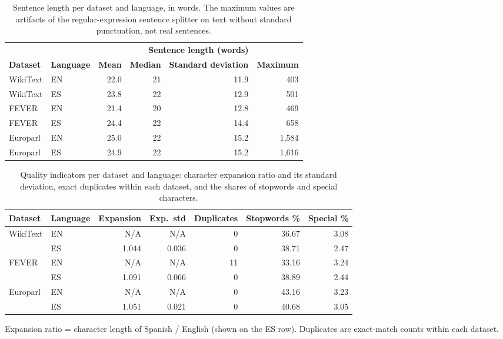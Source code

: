 \documentclass[11pt]{article}
\begin{document}
\begin{table}[h!]
\centering
\caption{Sentence length per dataset and language, in words. The maximum values are artifacts of the regular-expression sentence splitter on text without standard punctuation, not real sentences.}
\label{tabS:syntactic-stats}
\scriptsize
\begin{tabular*}{\textwidth}{@{\extracolsep{\fill}}llrrrr}
\toprule
& & \multicolumn{4}{c}{\textbf{Sentence length (words)}} \\
\cmidrule(lr){3-6}
\textbf{Dataset} & \textbf{Language} & \textbf{Mean} & \textbf{Median} & \textbf{Standard deviation} & \textbf{Maximum} \\
\midrule
WikiText & EN & 22.0 & 21 & 11.9 & 403 \\
WikiText & ES & 23.8 & 22 & 12.9 & 501 \\
\midrule
FEVER & EN & 21.4 & 20 & 12.8 & 469 \\
FEVER & ES & 24.4 & 22 & 14.4 & 658 \\
\midrule
Europarl & EN & 25.0 & 22 & 15.2 & 1,584 \\
Europarl & ES & 24.9 & 22 & 15.2 & 1,616 \\
\bottomrule
\end{tabular*}
\end{table}

\begin{table}[h!]
\centering
\caption{Quality indicators per dataset and language: character expansion ratio and its standard deviation, exact duplicates within each dataset, and the shares of stopwords and special characters.}
\label{tabS:quality-stats}
\scriptsize
\begin{tabular*}{\textwidth}{@{\extracolsep{\fill}}llrrrrr}
\toprule
\textbf{Dataset} & \textbf{Language} & \textbf{Expansion} & \textbf{Exp.\ std} & \textbf{Duplicates} & \textbf{Stopwords \%} & \textbf{Special \%} \\
\midrule
WikiText & EN & N/A & N/A & 0 & 36.67 & 3.08 \\
         & ES & 1.044 & 0.036 & 0 & 38.71 & 2.47 \\
\midrule
FEVER    & EN & N/A & N/A & 11 & 33.16 & 3.24 \\
         & ES & 1.091 & 0.066 & 0 & 38.89 & 2.44 \\
\midrule
Europarl & EN & N/A & N/A & 0 & 43.16 & 3.23 \\
         & ES & 1.051 & 0.021 & 0 & 40.68 & 3.05 \\
\bottomrule
\end{tabular*}
\par\smallskip\scriptsize Expansion ratio = character length of Spanish / English (shown on the ES row). Duplicates are exact-match counts within each dataset.
\end{table}
\end{document}
